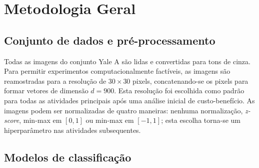 \documentclass[11pt,a4paper]{article}
\begin{document}
\section{Metodologia Geral}

\subsection{Conjunto de dados e pré-processamento}

Todas as imagens do conjunto Yale A são lidas e convertidas para tons de cinza. Para permitir experimentos computacionalmente factíveis, as imagens são reamostradas para a resolução de \(30 \times 30\) pixels, concatenando-se os pixels para formar vetores de dimensão \(d=900\). Esta resolução foi escolhida como padrão para todas as atividades principais após uma análise inicial de custo-benefício. As imagens podem ser normalizadas de quatro maneiras: nenhuma normalização, \emph{z-score}, min-max em \([0, 1]\) ou min-max em \([-1, 1]\); esta escolha torna-se um hiperparâmetro nas atividades subsequentes.

\subsection{Modelos de classificação}
\end{document}
